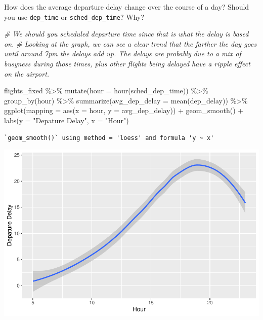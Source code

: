 \documentclass[
]{article}
\newenvironment{Shaded}{\begin{snugshade}}{\end{snugshade}}
\newcommand{\AttributeTok}[1]{\textcolor[rgb]{0.77,0.63,0.00}{#1}}
\newcommand{\CommentTok}[1]{\textcolor[rgb]{0.56,0.35,0.01}{\textit{#1}}}
\newcommand{\FunctionTok}[1]{\textcolor[rgb]{0.00,0.00,0.00}{#1}}
\newcommand{\NormalTok}[1]{#1}
\newcommand{\SpecialCharTok}[1]{\textcolor[rgb]{0.00,0.00,0.00}{#1}}
\newcommand{\StringTok}[1]{\textcolor[rgb]{0.31,0.60,0.02}{#1}}
\begin{document}
How does the average departure delay change over the course of a day?
Should you use \texttt{dep\_time} or \texttt{sched\_dep\_time}? Why?

\begin{Shaded}
\begin{Highlighting}[]
\CommentTok{\# We should you scheduled departure time since that is what the delay is based on.}
\CommentTok{\# Looking at the graph, we can see a clear trend that the farther the day goes until around 7pm the delays add up. The delays are probably due to a mix of busyness during those times, plus other flights being delayed have a ripple effect on the airport.}

\NormalTok{flights\_fixed }\SpecialCharTok{\%\textgreater{}\%}
  \FunctionTok{mutate}\NormalTok{(}\AttributeTok{hour =} \FunctionTok{hour}\NormalTok{(sched\_dep\_time)) }\SpecialCharTok{\%\textgreater{}\%}
  \FunctionTok{group\_by}\NormalTok{(hour) }\SpecialCharTok{\%\textgreater{}\%}
  \FunctionTok{summarize}\NormalTok{(}\AttributeTok{avg\_dep\_delay =} \FunctionTok{mean}\NormalTok{(dep\_delay)) }\SpecialCharTok{\%\textgreater{}\%}
  \FunctionTok{ggplot}\NormalTok{(}\AttributeTok{mapping =} \FunctionTok{aes}\NormalTok{(}\AttributeTok{x =}\NormalTok{ hour, }\AttributeTok{y =}\NormalTok{ avg\_dep\_delay)) }\SpecialCharTok{+}
  \FunctionTok{geom\_smooth}\NormalTok{() }\SpecialCharTok{+}
  \FunctionTok{labs}\NormalTok{(}\AttributeTok{y =} \StringTok{"Depature Delay"}\NormalTok{, }\AttributeTok{x =} \StringTok{"Hour"}\NormalTok{)}
\end{Highlighting}
\end{Shaded}

\begin{verbatim}
`geom_smooth()` using method = 'loess' and formula 'y ~ x'
\end{verbatim}

\includegraphics{Midterm.sa_files/figure-latex/unnamed-chunk-6-1.pdf}
\end{document}
